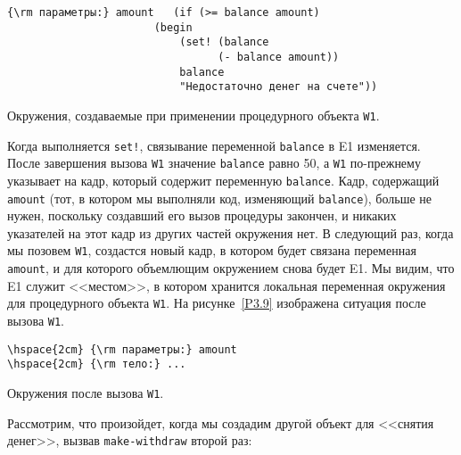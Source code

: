 \begin{cntrfig}

\begin{Verbatim}
{\rm параметры:} amount   (if (>= balance amount)
                       (begin
                           (set! (balance
                                 (- balance amount))
                           balance
                           "Недостаточно денег на счете"))
\end{Verbatim}
\caption{Окружения, создаваемые при применении
процедурного объекта {\tt W1}.}
\label{P3.8}

\end{cntrfig}

Когда выполняется {\tt set!}, связывание
переменной {\tt balance} в E1 изменяется. После завершения
вызова {\tt W1} значение {\tt balance} равно 50, а {\tt W1}
по-прежнему указывает на кадр, который содержит переменную
{\tt balance}.  Кадр, содержащий {\tt amount} (тот, в
котором мы выполняли код, изменяющий {\tt balance}), больше не
нужен, поскольку создавший его вызов процедуры закончен, и никаких указателей
на этот кадр из других частей окружения нет.  В следующий раз, когда
мы позовем {\tt W1}, создастся новый кадр, в котором будет
связана переменная {\tt amount}, и для которого объемлющим
окружением снова будет E1.  Мы видим, что E1 служит <<местом>>,
в котором хранится локальная переменная окружения для процедурного
объекта {\tt W1}.  На рисунке~\ref{P3.9} изображена
ситуация после вызова {\tt W1}.


\begin{cntrfig}

\begin{Verbatim}
\hspace{2cm} {\rm параметры:} amount
\hspace{2cm} {\rm тело:} ...
\end{Verbatim}
\caption{Окружения после вызова {\tt W1}.}
\label{P3.9}
\end{cntrfig}

Рассмотрим, что произойдет, когда мы создадим другой объект
для <<снятия денег>>, вызвав {\tt make-withdraw} второй раз:

